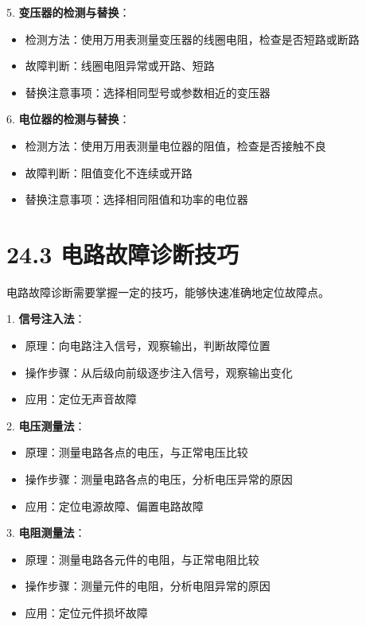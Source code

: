 \documentclass[12pt,UTF8]{ctexbook}
\begin{document}
5. \textbf{变压器的检测与替换}：
   \begin{itemize}[leftmargin=3.5em]
   \item 检测方法：使用万用表测量变压器的线圈电阻，检查是否短路或断路
   \item 故障判断：线圈电阻异常或开路、短路
   \item 替换注意事项：选择相同型号或参数相近的变压器
   \end{itemize}

6. \textbf{电位器的检测与替换}：
   \begin{itemize}[leftmargin=3.5em]
   \item 检测方法：使用万用表测量电位器的阻值，检查是否接触不良
   \item 故障判断：阻值变化不连续或开路
   \item 替换注意事项：选择相同阻值和功率的电位器
   \end{itemize}

\section*{24.3 电路故障诊断技巧}

电路故障诊断需要掌握一定的技巧，能够快速准确地定位故障点。

1. \textbf{信号注入法}：
   \begin{itemize}[leftmargin=3.5em]
   \item 原理：向电路注入信号，观察输出，判断故障位置
   \item 操作步骤：从后级向前级逐步注入信号，观察输出变化
   \item 应用：定位无声音故障
   \end{itemize}

2. \textbf{电压测量法}：
   \begin{itemize}[leftmargin=3.5em]
   \item 原理：测量电路各点的电压，与正常电压比较
   \item 操作步骤：测量电路各点的电压，分析电压异常的原因
   \item 应用：定位电源故障、偏置电路故障
   \end{itemize}

3. \textbf{电阻测量法}：
   \begin{itemize}[leftmargin=3.5em]
   \item 原理：测量电路各元件的电阻，与正常电阻比较
   \item 操作步骤：测量元件的电阻，分析电阻异常的原因
   \item 应用：定位元件损坏故障
   \end{itemize}
\end{document}
